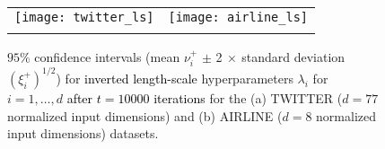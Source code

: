 \documentclass[conference]{IEEEtran}
\begin{document}
		\begin{figure}
			\begin{tabular}{cc}
				\hspace{-2mm}\texttt{[image: twitter\_ls]} &
				\hspace{-3mm}\texttt{[image: airline\_ls]}\vspace{-1mm}\\
				\hspace{-2mm}{(a)} & \hspace{-3mm}{(b)}\vspace{-2mm}
			\end{tabular}
			\caption{$95\%$ confidence intervals (mean $\nu^+_i$ $\pm$ 2$\ \times\ $standard deviation $(\xi^+_i)^{1/2}$) for \textcolor{black}{inverted length-scale} hyperparameters $\lambda_i$ for $i=1,\ldots,d$ \textcolor{black}{after $t=10000$ iterations} for the (a) TWITTER ($d=77$ normalized input dimensions) and (b) AIRLINE ($d=8$ normalized input dimensions) datasets.}
			\label{fig6}%
		\end{figure}
\end{document}
